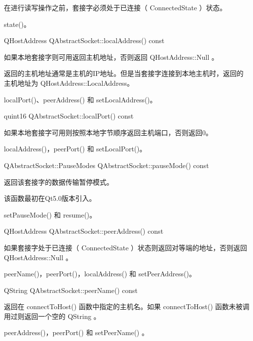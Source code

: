 \begin{notice}
在进行读写操作之前，套接字必须处于已连接（ ConnectedState ）状态。
\end{notice}


\begin{notice}[另请查阅]
 state()。
\end{notice}


QHostAddress QAbstractSocket::localAddress() const

如果本地套接字则可用返回主机地址，否则返回 QHostAddress::Null 。

返回的主机地址通常是主机的IP地址。但是当套接字连接到本地主机时，返回的主机地址为 QHostAddress::LocalAddress。

\begin{notice}[另请查阅]
 localPort()、peerAddress() 和 setLocalAddress()。
\end{notice}

quint16 QAbstractSocket::localPort() const

如果本地套接字可用则按照本地字节顺序返回主机端口，否则返回0。


\begin{notice}[另请查阅]
 localAddress()，peerPort() 和 setLocalPort()。
\end{notice}


QAbstractSocket::PauseModes QAbstractSocket::pauseMode() const

返回该套接字的数据传输暂停模式。

该函数最初在Qt5.0版本引入。


\begin{notice}[另请查阅]
 setPauseMode() 和 resume()。
\end{notice}

QHostAddress QAbstractSocket::peerAddress() const

如果套接字处于已连接（ ConnectedState ）状态则返回对等端的地址，否则返回 QHostAddress::Null 。


\begin{notice}[另请查阅]
peerName()，peerPort()，localAddress() 和 setPeerAddress()。
\end{notice}

QString QAbstractSocket::peerName() const

返回在 connectToHost() 函数中指定的主机名。如果 connectToHost() 函数未被调用过则返回一个空的 QString 。


\begin{notice}[另请查阅]
peerAddress()，peerPort() 和 setPeerName() 。
\end{notice}



